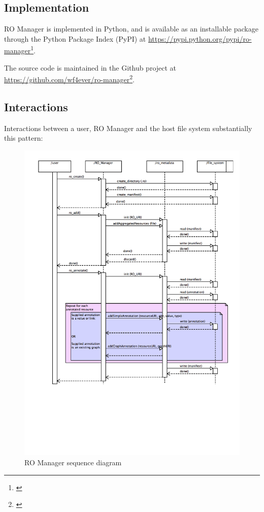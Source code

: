 \documentclass[11pt,oneside]{article}
\begin{document}
\subsection{Implementation}
\label{implementation}

RO Manager is implemented in Python, and is available as an installable package through the Python Package Index (PyPI) at \href{}{https://pypi.python.org/pypi/ro-manager}\footnote{\href{}{}}.

The source code is maintained in the Github project at \href{}{https://github.com/wf4ever/ro-manager}\footnote{\href{}{}}.

\subsection{Interactions}
\label{interactions}

Interactions between a user, RO Manager and the host file system substantially this pattern:

\begin{figure}
\caption{RO Manager sequence diagram}
\label{romanagersequencediagram}
\begin{center}
\includegraphics{Figures/RO_Manager_seq.png}
\end{center}
\end{figure}
\end{document}
